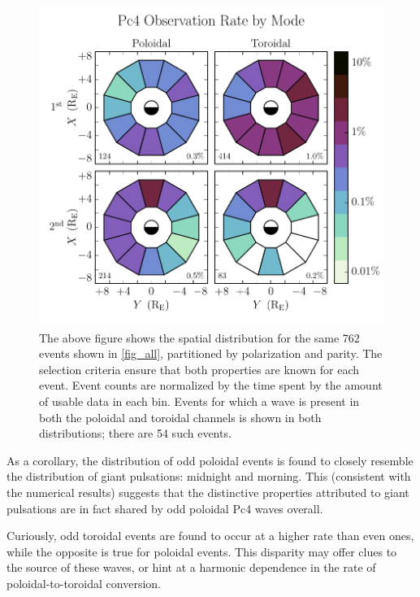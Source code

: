 \documentclass[draft,linenumbers]{agujournal}
\begin{document}
\begin{figure}
    \begin{center}
    \includegraphics[width=\textwidth]{figures/fig_mode.pdf}
    \caption{
        The above figure shows the spatial distribution for the same 762 events shown in \cref{fig_all}, partitioned by polarization and parity. The selection criteria ensure that both properties are known for each event. Event counts are normalized by the time spent by the amount of usable data in each bin. Events for which a wave is present in both the poloidal and toroidal channels is shown in both distributions; there are 54 such events.
    }
    \label{fig_mode}
    \end{center}
\end{figure}

As a corollary, the distribution of odd poloidal events is found to closely resemble the distribution of giant pulsations: midnight and morning. This (consistent with the numerical results) suggests that the distinctive properties attributed to giant pulsations are in fact shared by odd poloidal Pc4 waves overall.

Curiously, odd toroidal events are found to occur at a higher rate than even ones, while the opposite is true for poloidal events. This disparity may offer clues to the source of these waves, or hint at a harmonic dependence in the rate of poloidal-to-toroidal conversion.
\end{document}
